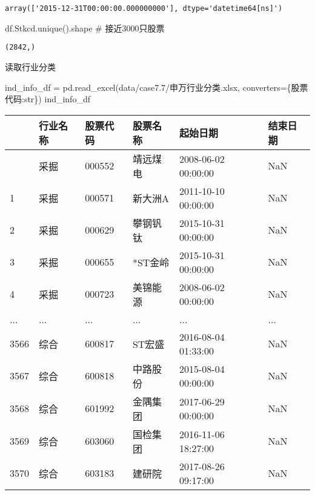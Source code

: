 \documentclass[
  letterpaper,
  DIV=11,
  numbers=noendperiod]{scrreprt}
\newenvironment{Shaded}{\begin{snugshade}}{\end{snugshade}}
\newcommand{\BuiltInTok}[1]{\textcolor[rgb]{0.00,0.23,0.31}{#1}}
\newcommand{\CommentTok}[1]{\textcolor[rgb]{0.37,0.37,0.37}{#1}}
\newcommand{\NormalTok}[1]{\textcolor[rgb]{0.00,0.23,0.31}{#1}}
\newcommand{\OperatorTok}[1]{\textcolor[rgb]{0.37,0.37,0.37}{#1}}
\newcommand{\StringTok}[1]{\textcolor[rgb]{0.13,0.47,0.30}{#1}}
\begin{document}
\begin{verbatim}
array(['2015-12-31T00:00:00.000000000'], dtype='datetime64[ns]')
\end{verbatim}

\begin{Shaded}
\begin{Highlighting}[]
\NormalTok{df.Stkcd.unique().shape  }\CommentTok{\# 接近3000只股票}
\end{Highlighting}
\end{Shaded}

\begin{verbatim}
(2842,)
\end{verbatim}

读取行业分类

\begin{Shaded}
\begin{Highlighting}[]
\NormalTok{ind\_info\_df }\OperatorTok{=}\NormalTok{ pd.read\_excel(}\StringTok{\textquotesingle{}data/case7.7/申万行业分类.xlsx\textquotesingle{}}\NormalTok{,}
\NormalTok{                converters}\OperatorTok{=}\NormalTok{\{}\StringTok{\textquotesingle{}股票代码\textquotesingle{}}\NormalTok{:}\BuiltInTok{str}\NormalTok{\})}
\NormalTok{ind\_info\_df}
\end{Highlighting}
\end{Shaded}

\begin{longtable}[]{@{}llllll@{}}
\toprule\noalign{}
& 行业名称 & 股票代码 & 股票名称 & 起始日期 & 结束日期 \\
\midrule\noalign{}
\endhead
\bottomrule\noalign{}
\endlastfoot
0 & 采掘 & 000552 & 靖远煤电 & 2008-06-02 00:00:00 & NaN \\
1 & 采掘 & 000571 & 新大洲A & 2011-10-10 00:00:00 & NaN \\
2 & 采掘 & 000629 & 攀钢钒钛 & 2015-10-31 00:00:00 & NaN \\
3 & 采掘 & 000655 & *ST金岭 & 2015-10-31 00:00:00 & NaN \\
4 & 采掘 & 000723 & 美锦能源 & 2008-06-02 00:00:00 & NaN \\
... & ... & ... & ... & ... & ... \\
3566 & 综合 & 600817 & ST宏盛 & 2016-08-04 01:33:00 & NaN \\
3567 & 综合 & 600818 & 中路股份 & 2015-08-04 00:00:00 & NaN \\
3568 & 综合 & 601992 & 金隅集团 & 2017-06-29 00:00:00 & NaN \\
3569 & 综合 & 603060 & 国检集团 & 2016-11-06 18:27:00 & NaN \\
3570 & 综合 & 603183 & 建研院 & 2017-08-26 09:17:00 & NaN \\
\end{longtable}
\end{document}
